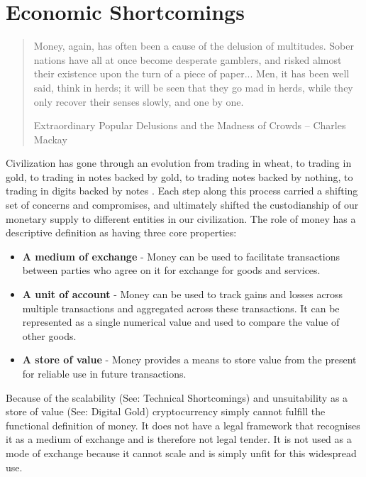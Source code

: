 \chapter{Economic Shortcomings}

\begin{quote}
Money, again, has often been a cause of the delusion of multitudes. Sober
nations have all at once become desperate gamblers, and risked almost their
existence upon the turn of a piece of paper... Men, it has been well said,
think in herds; it will be seen that they go mad in herds, while they only
recover their senses slowly, and one by one.
\begin{flushright}
Extraordinary Popular Delusions and the Madness of Crowds -- Charles Mackay
\end{flushright}
\end{quote}

Civilization has gone through an evolution from trading in wheat, to trading in
gold, to trading in notes backed by gold, to trading notes backed by nothing, to
trading in digits backed by notes \cite{eich_currency_2018}. Each step along
this process carried a shifting set of concerns and compromises, and ultimately
shifted the custodianship of our monetary supply to different entities in our
civilization.  The role of money has a descriptive definition as having three
core properties:

\begin{itemize}
\tightlist
\item
  \textbf{A medium of exchange} - Money can be used to facilitate transactions
  between parties who agree on it for exchange for goods and
  services.
\item
  \textbf{A unit of account} - Money can be used to track gains and losses across
  multiple transactions and aggregated across these transactions. It can be
  represented as a single numerical value and used to compare the value of
  other goods.
\item
  \textbf{A store of value} - Money provides a means to store value from the
  present for reliable use in future transactions.
\end{itemize}

Because of the scalability (See: Technical Shortcomings) and unsuitability as a
store of value (See: Digital Gold) cryptocurrency simply cannot fulfill the
functional definition of money. It does not have a legal framework that
recognises it as a medium of exchange and is therefore not legal tender.  It is
not used as a mode of exchange because it cannot scale and is simply unfit for
this widespread use. \cite{roubini2018exploring, budish2018economic}

